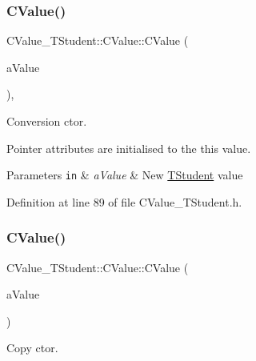 \subsubsection{\texorpdfstring{C\+Value()}{CValue()}\hspace{0.1cm}{\footnotesize\ttfamily [2/4]}}
{\footnotesize\ttfamily C\+Value\+\_\+\+T\+Student\+::\+C\+Value\+::\+C\+Value (\begin{DoxyParamCaption}\item[{const \hyperlink{struct_c_value___t_student_1_1_t_student}{T\+Student}}]{a\+Value }\end{DoxyParamCaption})\hspace{0.3cm}{\ttfamily [inline]}, {\ttfamily [explicit]}}



Conversion c\textquotesingle{}tor. 

Pointer attributes are initialised to the {\ttfamily this} value. 
\begin{DoxyParams}[1]{Parameters}
\mbox{\tt in}  & {\em a\+Value} & New \hyperlink{struct_c_value___t_student_1_1_t_student}{T\+Student} value \\
\hline
\end{DoxyParams}


Definition at line 89 of file C\+Value\+\_\+\+T\+Student.\+h.

\mbox{\label{class_c_value___t_student_1_1_c_value_a093fe369a13652f089a92884b60e0cfa}} 
\subsubsection{\texorpdfstring{C\+Value()}{CValue()}\hspace{0.1cm}{\footnotesize\ttfamily [3/4]}}
{\footnotesize\ttfamily C\+Value\+\_\+\+T\+Student\+::\+C\+Value\+::\+C\+Value (\begin{DoxyParamCaption}\item[{const \hyperlink{class_c_value___t_student_1_1_c_value}{C\+Value} \&}]{a\+Value }\end{DoxyParamCaption})\hspace{0.3cm}{\ttfamily [inline]}}



Copy c\textquotesingle{}tor. 

